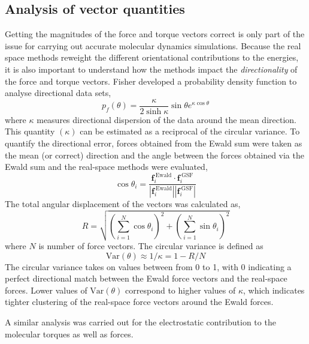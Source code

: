 \subsection{Analysis of vector quantities}
Getting the magnitudes of the force and torque vectors correct is only
part of the issue for carrying out accurate molecular dynamics
simulations.  Because the real space methods reweight the different
orientational contributions to the energies, it is also important to
understand how the methods impact the \textit{directionality} of the
force and torque vectors. Fisher developed a probability density
function to analyse directional data sets,
\begin{equation}
p_f(\theta) = \frac{\kappa}{2 \sinh\kappa}\sin\theta e^{\kappa \cos\theta}
\label{eq:pdf}
\end{equation}
where $\kappa$ measures directional dispersion of the data around the
mean direction.\cite{Fisher53} This quantity $(\kappa)$ can be
estimated as a reciprocal of the circular variance.\cite{Allen91} To
quantify the directional error, forces obtained from the Ewald sum
were taken as the mean (or correct) direction and the angle between
the forces obtained via the Ewald sum and the real-space methods were
evaluated,
\begin{equation}
  \cos\theta_i =  \frac{\mathbf{f}_i^\mathrm{~Ewald} \cdot
    \mathbf{f}_i^\mathrm{~GSF}}{\left|\mathbf{f}_i^\mathrm{~Ewald}\right| \left|\mathbf{f}_i^\mathrm{~GSF}\right|}
\end{equation}
The total angular displacement of the vectors was calculated as,
\begin{equation}
R = \sqrt{\left(\sum\limits_{i=1}^N \cos\theta_i\right)^2 + \left(\sum\limits_{i=1}^N \sin\theta_i\right)^2}
\label{eq:displacement}
\end{equation} 
where $N$ is number of force vectors.  The circular variance is
defined as
\begin{equation}
\mathrm{Var}(\theta) \approx 1/\kappa = 1 - R/N
\end{equation}
The circular variance takes on values between from 0 to 1, with 0
indicating a perfect directional match between the Ewald force vectors
and the real-space forces. Lower values of $\mathrm{Var}(\theta)$
correspond to higher values of $\kappa$, which indicates tighter
clustering of the real-space force vectors around the Ewald forces.

A similar analysis was carried out for the electrostatic contribution
to the molecular torques as well as forces.  

